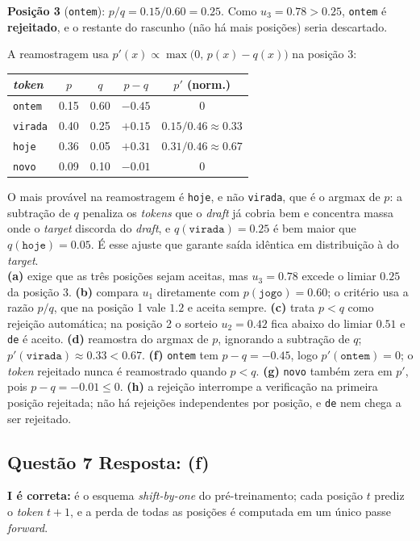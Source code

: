 \documentclass[11pt,a4paper]{article}
\begin{document}
\textbf{Posição 3} (\texttt{ontem}): $p/q = 0.15/0.60 = 0.25$. Como $u_3 = 0.78 > 0.25$, \texttt{ontem} é \textbf{rejeitado}, e o restante do rascunho (não há mais posições) seria descartado.

A reamostragem usa $p'(x) \propto \max\bigl(0,\, p(x) - q(x)\bigr)$ na posição 3:
\begin{center}
\begin{tabular}{|l|c|c|c|c|}
\hline
\textit{token} & $p$ & $q$ & $p - q$ & $p'$ (norm.) \\\hline
\texttt{ontem}  & 0.15 & 0.60 & $-0.45$ & $0$ \\\hline
\texttt{virada} & 0.40 & 0.25 & $+0.15$ & $0.15/0.46 \approx 0.33$ \\\hline
\texttt{hoje}   & 0.36 & 0.05 & $+0.31$ & $0.31/0.46 \approx 0.67$ \\\hline
\texttt{novo}   & 0.09 & 0.10 & $-0.01$ & $0$ \\\hline
\end{tabular}
\end{center}
O mais provável na reamostragem é \texttt{hoje}, e não \texttt{virada}, que é o argmax de $p$: a subtração de $q$ penaliza os \textit{tokens} que o \textit{draft} já cobria bem e concentra massa onde o \textit{target} discorda do \textit{draft}, e $q(\texttt{virada}) = 0.25$ é bem maior que $q(\texttt{hoje}) = 0.05$. É esse ajuste que garante saída idêntica em distribuição à do \textit{target}.\\
\textbf{(a)} exige que as três posições sejam aceitas, mas $u_3 = 0.78$ excede o limiar $0.25$ da posição 3.
\textbf{(b)} compara $u_1$ diretamente com $p(\texttt{jogo}) = 0.60$; o critério usa a razão $p/q$, que na posição 1 vale $1.2$ e aceita sempre.
\textbf{(c)} trata $p < q$ como rejeição automática; na posição 2 o sorteio $u_2 = 0.42$ fica abaixo do limiar $0.51$ e \texttt{de} é aceito.
\textbf{(d)} reamostra do argmax de $p$, ignorando a subtração de $q$; $p'(\texttt{virada}) \approx 0.33 < 0.67$.
\textbf{(f)} \texttt{ontem} tem $p - q = -0.45$, logo $p'(\texttt{ontem}) = 0$; o \textit{token} rejeitado nunca é reamostrado quando $p < q$.
\textbf{(g)} \texttt{novo} também zera em $p'$, pois $p - q = -0.01 \le 0$.
\textbf{(h)} a rejeição interrompe a verificação na primeira posição rejeitada; não há rejeições independentes por posição, e \texttt{de} nem chega a ser rejeitado.

\subsection*{Questão 7 \textemdash{} Resposta: (f)}
\textbf{I é correta:} é o esquema \textit{shift-by-one} do pré-treinamento; cada posição $t$ prediz o \textit{token} $t{+}1$, e a perda de todas as posições é computada em um único passe \textit{forward}.
\end{document}
